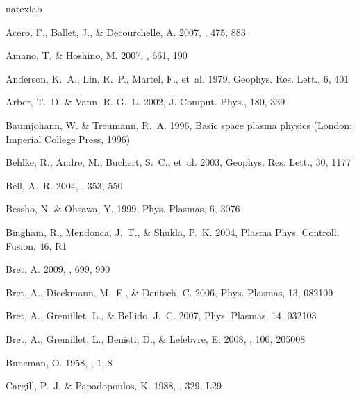 \documentclass[structabstract]{aa}
\begin{document}
\begin{thebibliography}{71}
\expandafter\ifx\csname natexlab\endcsname\relax\def\natexlab#1{#1}\fi

Acero, F., Ballet, J., \& Decourchelle, A. 2007, \aap, 475, 883

Amano, T. \& Hoshino, M. 2007, \apj, 661, 190

Anderson, K.~A., Lin, R.~P., Martel, F., {et~al.} 1979, Geophys. Res. Lett., 6,
  401

Arber, T.~D. \& Vann, R. G.~L. 2002, J. Comput. Phys., 180, 339

{Baumjohann}, W. \& {Treumann}, R.~A. 1996, {Basic space plasma physics}
  (London: Imperial College Press, 1996)

Behlke, R., Andre, M., Buchert, S.~C., {et~al.} 2003, Geophys. Res. Lett., 30,
  1177

Bell, A.~R. 2004, \mnras, 353, 550

Bessho, N. \& Ohsawa, Y. 1999, Phys. Plasmas, 6, 3076

Bingham, R., Mendonca, J.~T., \& Shukla, P.~K. 2004, Plasma Phys. Controll.
  Fusion, 46, R1

Bret, A. 2009, \apj, 699, 990

Bret, A., Dieckmann, M.~E., \& Deutsch, C. 2006, Phys. Plasmas, 13, 082109

Bret, A., Gremillet, L., \& Bellido, J.~C. 2007, Phys. Plasmas, 14, 032103

Bret, A., Gremillet, L., Benisti, D., \& Lefebvre, E. 2008, \prl, 100, 205008

Buneman, O. 1958, \prl, 1, 8

Cargill, P.~J. \& Papadopoulos, K. 1988, \apjl, 329, L29


\end{thebibliography}
\end{document}
